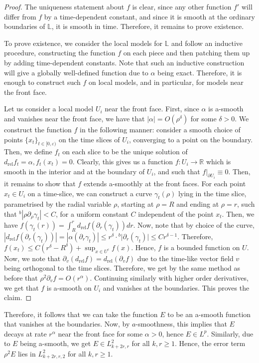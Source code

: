 \documentclass[10pt, a4paper]{article}
\theoremstyle{plain}%
\theoremstyle{definition}
\numberwithin{figure}{section}
\numberwithin{equation}{section}
\newcommand{\bL}{\mathbb{L}}
\newcommand{\bR}{\mathbb{R}}
\newcommand{\pa}{\partial}
\newcommand{\rt}{\rightarrow}
\newcommand{\ep}{\varepsilon}
\newcommand{\rel}{\mathrm{rel}}
\begin{document}
\begin{proof}
	The uniqueness statement about $f$ is clear, since any other function $f'$ will differ from $f$ by a time-dependent constant, and since it is smooth at the ordinary boundaries of $\bL$, it is smooth in time. Therefore, it remains to prove existence.
	
	To prove existence, we consider the local models for $\bL$ and follow an inductive procedure, constructing the function $f$ on each piece and then patching them up by adding time-dependent constants. Note that such an inductive construction will give a globally well-defined function due to $\alpha$ being exact. Therefore, it is enough to construct such $f$ on local models, and in particular, for models near the front face. 
	
	Let us consider a local model $U_i$ near the front face. First, since $\alpha$ is a-smooth and vanishes near the front face, we have that $|\alpha| = O(\rho^\delta)$ for some $\delta>0$. We construct the function $f$ in the following manner: consider a smooth choice of points $\{x_t\}_{t\in [0,\ep)}$ on the time slices of $U_i$, converging to a point on the boundary. Then, we define $f_t$ on each slice to be the unique solution of $d_\rel f_t = \alpha, f_t(x_t)=0$. Clearly, this gives us a function $f:U_i\rt \bR$ which is smooth in the interior and at the boundary of $U_i$, and such that $f|_{\pa U_i} \equiv0$. Then, it remains to show that $f$ extends a-smoothly at the front faces. For each point $x_t\in U_i$ on a time-slice, we can construct a curve $\gamma_t(\rho)$ lying in the time slice, parametrised by the radial variable $\rho$, starting at $\rho=R$ and ending at $\rho=r$, such that $^b|\rho{\pa_\rho}\gamma_t|<C$, for a uniform constant $C$ independent of the point $x_t$. Then, we have $f(\gamma_t(r)) = \int_{R}^{r}d_\rel f (\pa_r(\gamma_t))dr$. Now, note that by choice of the curve, $|d_\rel f(\pa_r (\gamma_t))| =|\alpha(\pa_r\gamma_t)| \leq r^\delta\cdot{^b|}\pa_r(\gamma_t)| \leq C r^{\delta-1}$. Therefore, $f(x_t) \leq C (r^\delta-R^\delta) + \sup_{x\in U^c} f(x) $. Hence, $f$ is a bounded function on $U$. Now, we note that $\pa_v(d_\rel f)= d_\rel (\pa_v f)$ due to the time-like vector field $v$ being orthogonal to the time slices. Therefore, we get by the same method as before that $\rho^2\pa_v f = O(r^\alpha)$. Continuing similarly with higher order derivatives, we get that $f$ is a-smooth on $U_i$ and vanishes at the boundaries. This proves the claim.
\end{proof}
 Therefore, it follows that we can take the function $E$ to be an a-smooth function that vanishes at the boundaries. Now, by $a$-smoothness, this implies that $E$ decays at rate $r^\alpha$ near the front face for some $\alpha>0$, hence $E\in L^p$. Similarly, due to $E$ being a-smooth, we get $E\in L^2_{k+2r,r}$ for all $k,r\geq 1$. Hence, the error term $\rho^2E$ lies in $L^2_{k+2r,r,2}$ for all $k,r\geq 1$.
\end{document}
